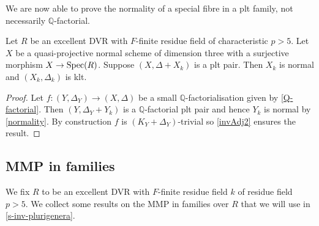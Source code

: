 	We are now able to prove the normality of a special fibre in a plt family, not necessarily $\mathbb{Q}$-factorial.
	\begin{corollary}\label{invAdj3}
		Let $R$ be an excellent DVR with $F$-finite residue field of characteristic $p> 5$. Let $X$ be a quasi-projective normal scheme of dimension three with a surjective morphism $X \to \operatorname{Spec}(R)$. 
		Suppose $(X,\Delta+X_{k})$ is a plt pair. Then $X_{k}$ is normal and $(X_{k}, \Delta_{k})$ is klt.	
	\end{corollary}
	
	\begin{proof}
		Let $f\colon (Y,\Delta_{Y})\to (X,\Delta)$ be a small $\mathbb{Q}$-factorialisation given by \autoref{Q-factorial}. Then $(Y,\Delta_{Y}+Y_{k})$ is a $\mathbb{Q}$-factorial plt pair and hence $Y_{k}$ is normal by \autoref{normality}. By construction $f$ is $(K_{Y}+\Delta_{Y})$-trivial so \autoref{invAdj2} ensures the result.
	\end{proof}
	
	\subsection{MMP in families}
	
	We fix $R$ to be an excellent DVR with $F$-finite residue field $k$ of residue field $p>5$.
	We collect some results on the MMP in families over $R$ that we will use in \autoref{s-inv-plurigenera}.
	

